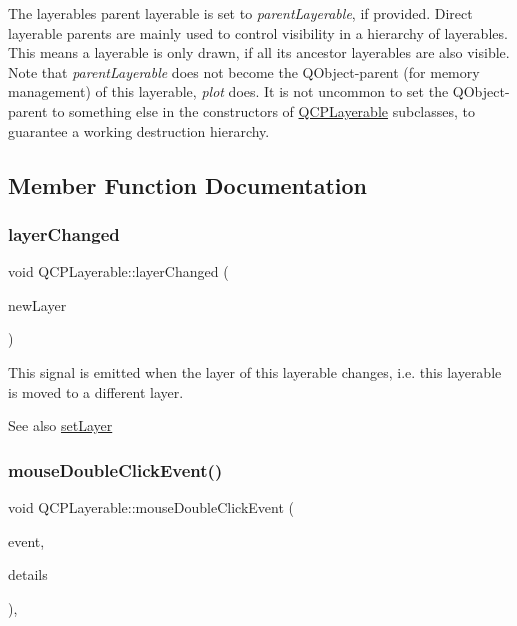 The layerable\textquotesingle{}s parent layerable is set to {\itshape parent\+Layerable}, if provided. Direct layerable parents are mainly used to control visibility in a hierarchy of layerables. This means a layerable is only drawn, if all its ancestor layerables are also visible. Note that {\itshape parent\+Layerable} does not become the Q\+Object-\/parent (for memory management) of this layerable, {\itshape plot} does. It is not uncommon to set the Q\+Object-\/parent to something else in the constructors of \hyperlink{classQCPLayerable}{Q\+C\+P\+Layerable} subclasses, to guarantee a working destruction hierarchy. 

\subsection{Member Function Documentation}
\mbox{\label{classQCPLayerable_abbf8657cedea73ac1c3499b521c90eba}} 
\subsubsection{\texorpdfstring{layer\+Changed}{layerChanged}}
{\footnotesize\ttfamily void Q\+C\+P\+Layerable\+::layer\+Changed (\begin{DoxyParamCaption}\item[{\hyperlink{classQCPLayer}{Q\+C\+P\+Layer} $\ast$}]{new\+Layer }\end{DoxyParamCaption})\hspace{0.3cm}{\ttfamily [signal]}}

This signal is emitted when the layer of this layerable changes, i.\+e. this layerable is moved to a different layer.

\begin{DoxySeeAlso}{See also}
\hyperlink{classQCPLayerable_ab0d0da6d2de45a118886d2c8e16d5a54}{set\+Layer} 
\end{DoxySeeAlso}
\mbox{\label{classQCPLayerable_a4171e2e823aca242dd0279f00ed2de81}} 
\subsubsection{\texorpdfstring{mouse\+Double\+Click\+Event()}{mouseDoubleClickEvent()}}
{\footnotesize\ttfamily void Q\+C\+P\+Layerable\+::mouse\+Double\+Click\+Event (\begin{DoxyParamCaption}\item[{Q\+Mouse\+Event $\ast$}]{event,  }\item[{const Q\+Variant \&}]{details }\end{DoxyParamCaption})\hspace{0.3cm}{\ttfamily [protected]}, {\ttfamily [virtual]}}

